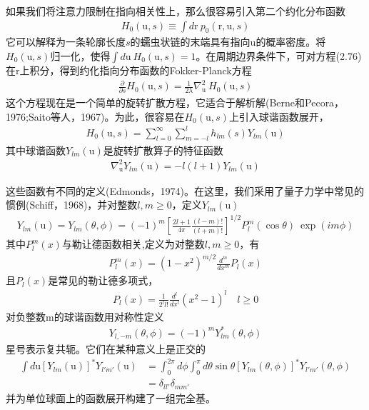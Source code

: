 如果我们将注意力限制在指向相关性上，那么很容易引入第二个约化分布函数\\
\begin{gather}
H_0(\mathrm{u},s)\equiv\int d\mathrm{r}\ p_0(\mathrm{r},\mathrm{u},s)
\end{gather}
它可以解释为一条轮廓长度$s$的蠕虫状链的末端具有指向$\mathrm{u}$的概率密度。将$H_0(\mathrm{u},s)$归一化，使得$\int d\mathrm{u}\  H_0(\mathrm{u},s)=1$。在周期边界条件下，可对方程(2.76)在$\mathrm{r}$上积分，得到约化指向分布函数的Fokker-Planck方程\\
\begin{gather}
\frac{\partial}{\partial s}H_0(\mathrm{u},s)=\frac{1}{2\lambda}\nabla_\mathrm{u}^2\ H_0(\mathrm{u},s)
\end{gather}
这个方程现在是一个简单的旋转扩散方程，它适合于解析解(Berne和Pecora，1976;Saito等人，1967)。为此，很容易在$H_0(\mathrm{u},s)$上引入球谐函数展开，\\
\begin{gather}
H_0(\mathrm{u},s)=\sum_{l=0}^{\infty}\sum_{m=-l}^{l}h_{lm}(s)Y_{lm}(\mathrm{u})
\end{gather}
其中球谐函数$Y_{lm}(\mathrm{u})$是旋转扩散算子的特征函数
\begin{gather}
\nabla_\mathrm{u}^2Y_{lm}(\mathrm{u}) =-l(l+1)Y_{lm}(\mathrm{u})
\end{gather}

这些函数有不同的定义(Edmonds，1974)。在这里，我们采用了量子力学中常见的惯例(Schiff，1968)，并对整数$l,m\geq 0$，定义$Y_{lm}(\mathrm{u})$\\
\begin{gather}
Y_{lm}(\mathrm{u}) = Y_{lm}(\theta,\phi)=(-1)^m\left[\frac{2l+1}{4\pi}\frac{(l-m)!}{(l+m)!}\right]^{1/2}P_l^m(\cos \theta )\ \exp(im\phi)
\end{gather}
其中$P_l^m(x)$与勒让德函数相关,定义为对整数$l,m\geq 0$，有\\
\begin{gather}
P_l^m(x)=(1-x^2)^{m/2}\frac{d^m}{dx^m}P_l(x)
\end{gather}
且$P_l(x)$是常见的勒让德多项式，\\
\begin{gather}
P_l(x)=\frac{1}{2^ll!}\frac{d^l}{dx^l}(x^2-1)^l\quad l\geq 0
\end{gather}
对负整数m的球谐函数用对称性定义\\
\begin{gather}
Y_{l,-m}(\theta,\phi) =(-1)^m Y_{lm}^*(\theta,\phi)
\end{gather}
星号表示复共轭。它们在某种意义上是正交的\\
\begin{equation}
\begin{aligned}
\int d\mathrm{u} \left[Y_{lm}(\mathrm{u})\right]^*Y_{l'm'}(\mathrm{u})&=\int_{0}^{2\pi}d\phi\int_{0}^{\pi}d\theta\sin\theta\left[Y_{lm}(\theta,\phi)\right]^*Y_{l'm'}(\theta,\phi)\\&=\delta_{ll'}\delta_{mm'}
\end{aligned}
\end{equation}
并为单位球面上的函数展开构建了一组完全基。\\

